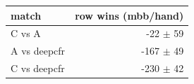 \begin{tabular}{lr}
\toprule
match & row wins (mbb/hand) \\
\midrule
C vs A & -22 $\pm$ 59 \\
A vs deepcfr & -167 $\pm$ 49 \\
C vs deepcfr & -230 $\pm$ 42 \\
\bottomrule
\end{tabular}

